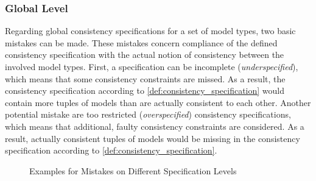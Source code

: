 \subsubsection{Global Level}
Regarding global consistency specifications for a set of model types, two basic mistakes can be made. 
These mistakes concern compliance of the defined consistency specification with the actual notion of consistency between the involved model types.
First, a specification can be incomplete (\emph{underspecified}), which means that some consistency constraints are missed. 
As a result, the consistency specification according to \autoref{def:consistency_specification} would contain more tuples of models than are actually consistent to each other. 
Another potential mistake are too restricted (\emph{overspecified}) consistency specifications, which means that additional, faulty consistency constraints are considered. 
As a result, actually consistent tuples of models would be missing in the consistency specification according to \autoref{def:consistency_specification}. 

\begin{figure}[bt]
    \centering
    
    \caption{Examples for Mistakes on Different Specification Levels}
    \label{fig:errors:mistakes_specification_levels}
\end{figure}

